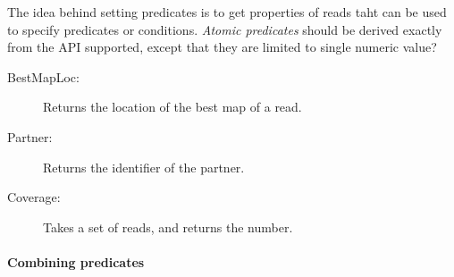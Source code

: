 \documentclass[10pt]{article}
\newcommand{\old}[1]{}
\begin{document}
The idea behind setting predicates is to get properties of reads taht
can be used to specify predicates or conditions. \emph{Atomic
  predicates} should be derived exactly from the API supported, except
that they are limited to single numeric value?
\begin{description}
\item[BestMapLoc:] Returns the location of the best map of a read. 
\item[Partner:] Returns the identifier of the partner.
\item[Coverage:] Takes a set of reads, and returns the number.
\end{description}

\paragraph{Combining predicates}

\old{
\paragraph{Indexing for efficient predicate queries}
We will support an API called {\sc MakeIndex}(Predicate $P$). At an
abstract level, we think of the `index on a predicate' as being a set
of \<location,value\> pairs with the following semantics: An entry
$(\ell,v)$ implies that the predicate when applied to reads mapping to
location $\ell$ returns value $v$.
}




\end{document}
